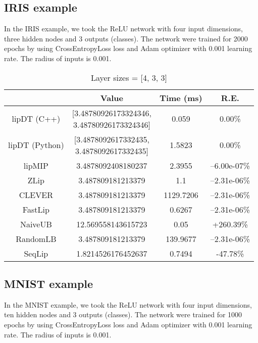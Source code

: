 \documentclass[11pt]{article}
\begin{document}
\subsection{IRIS example}
In the IRIS example, we took the ReLU network with four input dimensions, three hidden nodes and 3 outputs (classes). The network were trained for 2000 epochs by using CrossEntropyLoss loss and Adam optimizer with 0.001 learning rate. The radius of inputs is 0.001. 

\begin{table}[H]
\centering
\caption{Layer sizes = [4, 3, 3]}
\begin{tabular}{|c|c|c|c|}
\hline
                & Value                              & Time (ms)      &R.E. \\ \hline
lipDT (C++) &  \makecell*[c]{[3.48780926173324346,\\ 3.48780926173324346]} & 0.059  & 0.00\%  \\ \hline
lipDT (Python) &  \makecell*[c]{[3.4878092617332435,\\ 3.4878092617332435]} & 1.5823  & 0.00\%  \\ \hline
lipMIP          & 3.4878092408180237                 & 2.3955   & --6.00e-07\% \\ \hline
ZLip            & 3.487809181213379					 & 1.1    & --2.31e-06\% \\ \hline
CLEVER          & 3.487809181213379					 & 1129.7206 & --2.31e-06\% \\ \hline
FastLip         & 3.487809181213379					 & 0.6267    & --2.31e-06\% \\ \hline
NaiveUB         & 12.569558143615723                 & 0.05    & +260.39\% \\ \hline
RandomLB        & 3.487809181213379                  & 139.9677  & --2.31e-06\% \\ \hline
SeqLip          & 1.8214526176452637                  & 0.7494   & 
-47.78\% \\ \hline
\end{tabular}
\end{table}

\subsection{MNIST example}
In the MNIST example, we took the ReLU network with four input dimensions, ten hidden nodes and 3 outputs (classes). The network were trained for 1000 epochs by using CrossEntropyLoss loss and Adam optimizer with 0.001 learning rate. The radius of inputs is 0.001. 
\end{document}
